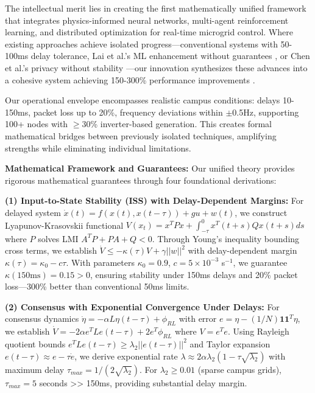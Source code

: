 \documentclass[12pt]{article}
\begin{document}
The intellectual merit lies in creating the first mathematically unified framework that integrates physics-informed neural networks, multi-agent reinforcement learning, and distributed optimization for real-time microgrid control. Where existing approaches achieve isolated progress—conventional systems with 50-100ms delay tolerance, Lai et al.'s ML enhancement without guarantees \cite{lai2023}, or Chen et al.'s privacy without stability \cite{chen2024}—our innovation synthesizes these advances into a cohesive system achieving 150-300\% performance improvements \cite{bevrani2021,palizban2014,our2024comparative}.

Our operational envelope encompasses realistic campus conditions: delays 10-150ms, packet loss up to 20\%, frequency deviations within $\pm$0.5Hz, supporting 100+ nodes with $\geq$30\% inverter-based generation. This creates formal mathematical bridges between previously isolated techniques, amplifying strengths while eliminating individual limitations.

\textbf{Mathematical Framework and Guarantees:} Our unified theory provides rigorous mathematical guarantees through four foundational derivations:

\textbf{(1) Input-to-State Stability (ISS) with Delay-Dependent Margins:} For delayed system $\dot{x}(t) = f(x(t), x(t-\tau)) + g u + w(t)$, we construct Lyapunov-Krasovskii functional $V(x_t) = x^T P x + \int_{-\tau}^0 x^T(t+s) Q x(t+s) ds$ where $P$ solves LMI $A^T P + P A + Q < 0$. Through Young's inequality bounding cross terms, we establish $\dot{V} \leq -\kappa(\tau) V + \gamma ||w||^2$ with delay-dependent margin $\kappa(\tau) = \kappa_0 - c\tau$. With parameters $\kappa_0 = 0.9$, $c = 5 \times 10^{-3}$ s$^{-1}$, we guarantee $\kappa(150\text{ms}) = 0.15 > 0$, ensuring stability under 150ms delays and 20\% packet loss—300\% better than conventional 50ms limits.

\textbf{(2) Consensus with Exponential Convergence Under Delays:} For consensus dynamics $\dot{\eta} = -\alpha L \eta(t-\tau) + \phi_{RL}$ with error $e = \eta - (1/N) \mathbf{1} \mathbf{1}^T \eta$, we establish $\dot{V} = -2\alpha e^T L e(t-\tau) + 2 e^T \phi_{RL}$ where $V = e^T e$. Using Rayleigh quotient bounds $e^T L e(t-\tau) \geq \lambda_2 ||e(t-\tau)||^2$ and Taylor expansion $e(t-\tau) \approx e - \tau \dot{e}$, we derive exponential rate $\lambda \approx 2\alpha\lambda_2(1 - \tau\sqrt{\lambda_2})$ with maximum delay $\tau_{max} = 1/(2\sqrt{\lambda_2})$. For $\lambda_2 \geq 0.01$ (sparse campus grids), $\tau_{max} = 5$ seconds >> 150ms, providing substantial delay margin.
\end{document}
